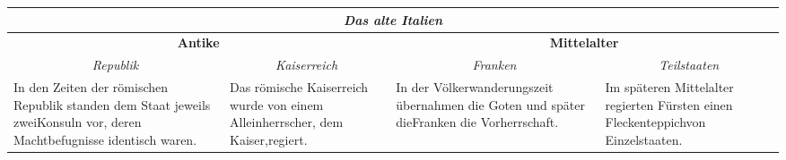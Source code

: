 \begin{tabular}{|p{3cm}|p{3cm}|p{3cm}|p{3cm}|}\hline
\multicolumn{4}{|c|}{\bfseries\itshape Das alte Italien}\\\hline
\multicolumn{2}{|c|}{\bfseries Antike} &
\multicolumn{2}{c|}{\bfseries Mittelalter}\\\hline
\multicolumn{1}{|c|}{\itshape Republik}&
\multicolumn{1}{c|}{\itshape Kaiserreich}&
\multicolumn{1}{c|}{\itshape Franken}&
\multicolumn{1}{c|}{\itshape Teilstaaten}\\\hline
In den Zeiten der r\"{o}mischen Republik standen dem Staat jeweils zweiKonsuln vor, deren Machtbefugnisse identisch waren. &
Das r\"{o}mische Kaiserreich wurde von einem Alleinherrscher, dem Kaiser,regiert.&
In der V\"{o}lkerwanderungszeit \"{u}bernahmen die Goten und sp\"{a}ter dieFranken die Vorherrschaft.&
Im sp\"{a}teren Mittelalter regierten F\"{u}rsten einen Fleckenteppichvon Einzelstaaten.\\\hline
\end{tabular}
